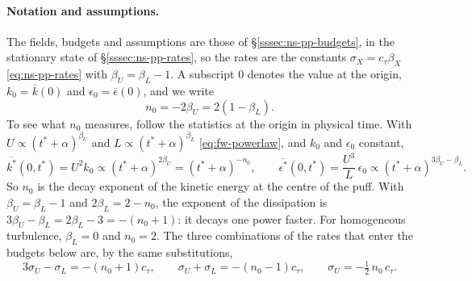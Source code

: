 \documentclass{article}
\begin{document}
\paragraph{Notation and assumptions.}
The fields, budgets and assumptions are those of
\S\ref{sssec:ns-pp-budgets}, in the stationary state of
\S\ref{sssec:ns-pp-rates}, so the rates are the constants
$\sigma_X = c_\tau \beta_X$ \eqref{eq:ns-pp-rates} with
$\beta_U = \beta_L - 1$. A subscript $0$ denotes the value at the origin,
$k_0 = \overline{k}(0)$ and $\epsilon_0 = \overline{\epsilon}(0)$, and we
write
\begin{equation}\label{eq:puff-n0}
  n_0 = -2\beta_U = 2\left( 1 - \beta_L \right) .
\end{equation}
To see what $n_0$ measures, follow the statistics at the origin in physical
time. With $U \propto (t^* + \alpha)^{\beta_U}$ and
$L \propto (t^* + \alpha)^{\beta_L}$ \eqref{eq:fw-powerlaw}, and $k_0$ and
$\epsilon_0$ constant,
\begin{equation*}
  \overline{k^*}(0, t^*) = U^2 k_0 \propto (t^* + \alpha)^{2\beta_U} = (t^* + \alpha)^{-n_0} ,
  \qquad
  \overline{\epsilon^*}(0, t^*) = \frac{U^3}{L}\, \epsilon_0 \propto (t^* + \alpha)^{3\beta_U - \beta_L} .
\end{equation*}
So $n_0$ is the decay exponent of the kinetic energy at the centre of the
puff. With $\beta_U = \beta_L - 1$ and $2\beta_L = 2 - n_0$, the exponent of
the dissipation is $3\beta_U - \beta_L = 2\beta_L - 3 = -(n_0 + 1)$: it decays
one power faster. For homogeneous turbulence, $\beta_L = 0$ and $n_0 = 2$.
The three combinations of the rates that enter the budgets below are, by the
same substitutions,
\begin{equation}\label{eq:puff-rates}
  3\sigma_U - \sigma_L = -\left( n_0 + 1 \right) c_\tau ,
  \qquad
  \sigma_U + \sigma_L = -\left( n_0 - 1 \right) c_\tau ,
  \qquad
  \sigma_U = -\tfrac12\, n_0\, c_\tau .
\end{equation}
\end{document}
